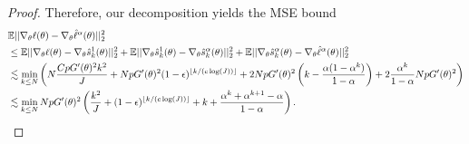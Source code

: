 \begin{proof}
Therefore, our decomposition yields the MSE bound
\begin{align}
    &\mathbb{E}||\nabla_\theta\ell(\theta) - \nabla_\theta \hat\ell^\alpha(\theta)||_2^2 \\
    &\leq \mathbb{E}||\nabla_\theta\ell(\theta) - \nabla_\theta\hat s_k^1(\theta)||_2^2 + \mathbb{E}||\nabla_\theta\hat s_k^1(\theta) - \nabla_\theta\hat s_k^\alpha(\theta)||_2^2 + \mathbb{E}||\nabla_\theta\hat s_k^\alpha(\theta) -  \nabla_\theta\hat\ell^\alpha(\theta)||_2^2 \\
    &\lesssim \min_{k \leq N} \left(N\frac{CpG'(\theta)^2k^2}{J} + NpG'(\theta)^2(1-\epsilon)^{\lfloor k/(c\log(J)) \rfloor} + 2NpG'(\theta)^2\left(k-\frac{\alpha(1-\alpha^k)}{1-\alpha}\right) + 2\frac{\alpha^k}{1-\alpha}NpG'(\theta)^2\right) \\
    &\lesssim \min_{k \leq N} NpG'(\theta)^2\left(\frac{k^2}{J}+(1-\epsilon)^{\lfloor k/(c\log(J)) \rfloor}+k+\frac{\alpha^k  + \alpha^{k+1} - \alpha}{1-\alpha}\right).
\end{align}

\end{proof}


